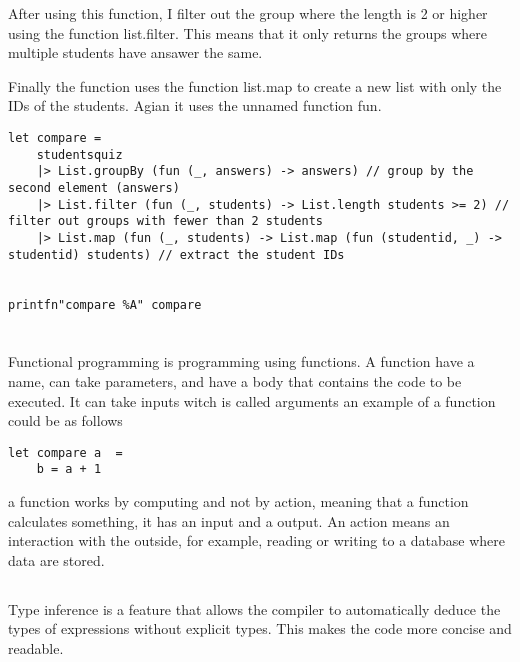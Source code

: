 \documentclass{article}
\begin{document}
After using this function, I filter out the group where the length is 2 or higher using the function list.filter. This means that it only returns the groups where multiple students have ansawer the same.

Finally the function uses the function list.map to create a new list with only the IDs of the students. Agian it uses the unnamed function fun.




 \begin{lstlisting}
let compare = 
    studentsquiz
    |> List.groupBy (fun (_, answers) -> answers) // group by the second element (answers)
    |> List.filter (fun (_, students) -> List.length students >= 2) // filter out groups with fewer than 2 students
    |> List.map (fun (_, students) -> List.map (fun (studentid, _) -> studentid) students) // extract the student IDs


printfn"compare %A" compare

    \end{lstlisting}



\section{}

\subsection{}

Functional programming is programming using functions. A function have a name, can take parameters, and have a body that contains the code to be executed. It can take inputs witch is called arguments an example of a function could be 
as follows

 \begin{lstlisting}
let compare a  = 
    b = a + 1
\end{lstlisting}

a function works by computing and not by action, meaning that a function calculates something, it has an input and a output. An action means an interaction with the outside, for example, reading or writing to a database where data are stored.



\subsection{}
Type inference is a feature that allows the compiler to automatically deduce the types of expressions without explicit types. This makes the code more concise and readable. 
\end{document}
